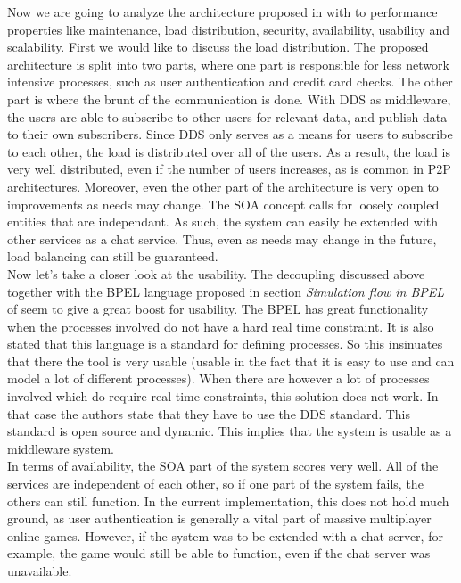 Now we are going to analyze the architecture proposed in \cite{service} with to performance properties like maintenance, load distribution, security, availability, usability and scalability. 
First we would like to discuss the load distribution.
The proposed architecture is split into two parts, where one part is responsible for less network intensive processes, such as user authentication and credit card checks. 
The other part is where the brunt of the communication is done.
With DDS as middleware, the users are able to subscribe to other users for relevant data, and publish data to their own subscribers.
Since DDS only serves as a means for users to subscribe to each other, the load is distributed over all of the users.
As a result, the load is very well distributed, even if the number of users increases, as is common in P2P architectures. 
Moreover, even the other part of the architecture is very open to improvements as needs may change.
The SOA concept calls for loosely coupled entities that are independant.
As such, the system can easily be extended with other services as a chat service.
Thus, even as needs may change in the future, load balancing can still be guaranteed. \\
Now let’s take a closer look at the usability. 
The decoupling discussed above together with the BPEL language proposed in section \emph{Simulation flow in BPEL} of \cite{service} seem to give a great boost for usability. 
The BPEL has great functionality when the processes involved do not have a hard real time constraint. 
It is also stated that this language is a standard for defining processes. 
So this insinuates that there the tool is very usable (usable in the fact that it is easy to use and can model a lot of different processes). 
When there are however a lot of processes involved which do require real time constraints, this solution does not work. 
In that case the authors state that they have to use the DDS standard. 
This standard is open source and dynamic. 
This implies that the system is usable as a middleware system. \\
In terms of availability, the SOA part of the system scores very well.
All of the services are independent of each other, so if one part of the system fails, the others can still function.
In the current implementation, this does not hold much ground, as user authentication is generally a vital part of massive multiplayer online games.
However, if the system was to be extended with a chat server, for example, the game would still be able to function, even if the chat server was unavailable.
